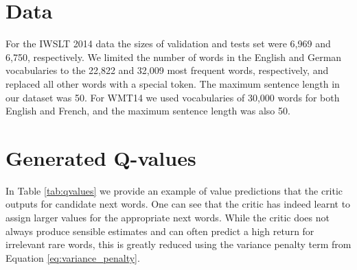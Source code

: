 \section{Data}
\label{sec:data}
For the IWSLT 2014 data the sizes of validation and tests set were 6,969 and 6,750, 
respectively. We limited the number of words in the English and German
vocabularies to the 22,822 and 32,009 most frequent words, respectively, and
replaced all other words with a special token. The maximum sentence length
in our dataset was 50. For WMT14 we used vocabularies of 30,000 words for both English and French, and the maximum sentence length was also 50.


\section{Generated Q-values}

In Table \ref{tab:qvalues} we provide an example of value predictions
that the critic outputs for candidate next words. One can see that the critic has
indeed learnt to assign larger values for the appropriate next words.
While the critic does not always produce sensible estimates and can often predict
a high return for irrelevant rare words, this is greatly reduced using the variance
penalty term from Equation \eqref{eq:variance_penalty}.

